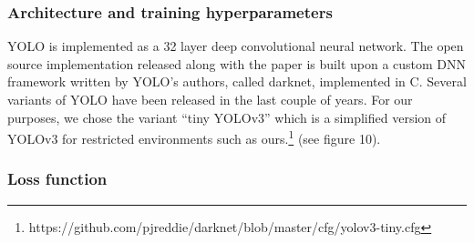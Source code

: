 \documentclass[a4paper]{article}
\begin{document}
\subsubsection*{Architecture and training hyperparameters}
YOLO is implemented as a 32 layer deep convolutional
neural network. The open source implementation released
along with the paper is built upon a custom DNN
framework written by YOLO’s authors, called darknet, implemented in C.
Several variants of YOLO have been released in the last couple of years. For our purposes, we
chose the variant ``tiny YOLOv3'' which is a simplified version of YOLOv3 for restricted environments such as ours.\footnote{https://github.com/pjreddie/darknet/blob/master/cfg/yolov3-tiny.cfg} (see figure 10). 
\subsubsection*{Loss function}
\end{document}
